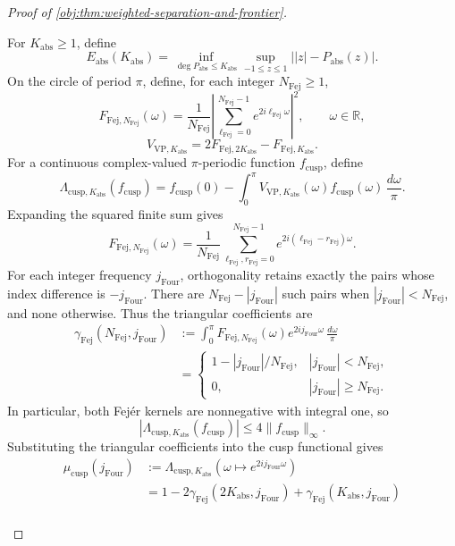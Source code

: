 \documentclass[11pt]{article}
\begin{document}
\begin{proof}[Proof of \cref{obj:thm:weighted-separation-and-frontier}]
\begin{enumerate}
For \(K_{\mathrm{abs}}\ge1\), define
\[
E_{\mathrm{abs}}(K_{\mathrm{abs}})
=\inf_{\deg P_{\mathrm{abs}}\le K_{\mathrm{abs}}}
\sup_{-1\le z\le1}\bigl||z|-P_{\mathrm{abs}}(z)\bigr|.
\]
On the circle of period \(\pi\), define, for each integer \(N_{\mathrm{Fej}}\ge1\),
\[
F_{\mathrm{Fej},N_{\mathrm{Fej}}}(\omega)
=\frac1{N_{\mathrm{Fej}}}
\left|\sum_{\ell_{\mathrm{Fej}}=0}^{N_{\mathrm{Fej}}-1}
 e^{2i\ell_{\mathrm{Fej}}\omega}\right|^2,
\qquad \omega\in\mathbb R,
\]
\[
V_{\mathrm{VP},K_{\mathrm{abs}}}
=2F_{\mathrm{Fej},2K_{\mathrm{abs}}}
-F_{\mathrm{Fej},K_{\mathrm{abs}}}.
\]
For a continuous complex-valued \(\pi\)-periodic function \(f_{\mathrm{cusp}}\), define
\[
\Lambda_{\mathrm{cusp},K_{\mathrm{abs}}}(f_{\mathrm{cusp}})
=f_{\mathrm{cusp}}(0)-\int_0^\pi
V_{\mathrm{VP},K_{\mathrm{abs}}}(\omega)
 f_{\mathrm{cusp}}(\omega)\,\frac{d\omega}{\pi}.
\]
Expanding the squared finite sum gives
\[
F_{\mathrm{Fej},N_{\mathrm{Fej}}}(\omega)
=\frac1{N_{\mathrm{Fej}}}
\sum_{\ell_{\mathrm{Fej}},r_{\mathrm{Fej}}=0}^{N_{\mathrm{Fej}}-1}
 e^{2i(\ell_{\mathrm{Fej}}-r_{\mathrm{Fej}})\omega}.
\]
For each integer frequency \(j_{\mathrm{Four}}\), orthogonality retains exactly the pairs whose index difference is \(-j_{\mathrm{Four}}\). There are
\(N_{\mathrm{Fej}}-|j_{\mathrm{Four}}|\) such pairs when
\(|j_{\mathrm{Four}}|<N_{\mathrm{Fej}}\), and none otherwise. Thus the triangular coefficients are
\[
\begin{aligned}
\gamma_{\mathrm{Fej}}(N_{\mathrm{Fej}},j_{\mathrm{Four}})
&:=\int_0^\pi F_{\mathrm{Fej},N_{\mathrm{Fej}}}(\omega)
 e^{2ij_{\mathrm{Four}}\omega}\,\frac{d\omega}{\pi}\\
&=\begin{cases}
1-|j_{\mathrm{Four}}|/N_{\mathrm{Fej}},
&|j_{\mathrm{Four}}|<N_{\mathrm{Fej}},\\
0,&|j_{\mathrm{Four}}|\ge N_{\mathrm{Fej}}.
\end{cases}
\end{aligned}
\]
In particular, both Fej\'er kernels are nonnegative with integral one, so
\[
|\Lambda_{\mathrm{cusp},K_{\mathrm{abs}}}(f_{\mathrm{cusp}})|
\le4\|f_{\mathrm{cusp}}\|_\infty.
\]
Substituting the triangular coefficients into the cusp functional gives
\[
\begin{aligned}
\mu_{\mathrm{cusp}}(j_{\mathrm{Four}})
&:=\Lambda_{\mathrm{cusp},K_{\mathrm{abs}}}
 (\omega\mapsto e^{2ij_{\mathrm{Four}}\omega})\\
&=1-2\gamma_{\mathrm{Fej}}(2K_{\mathrm{abs}},j_{\mathrm{Four}})
 +\gamma_{\mathrm{Fej}}(K_{\mathrm{abs}},j_{\mathrm{Four}})\\

\end{aligned}\]
\end{enumerate}
\end{proof}
\end{document}
